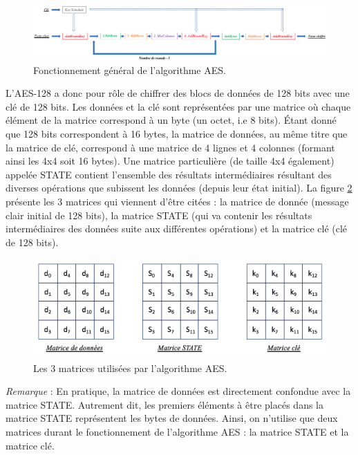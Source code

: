 \documentclass[oneside]{book}
\begin{document}
\vspace{0.5cm}

\begin{figure}[htbp]
    \hspace{-2.1cm}
    \includegraphics[scale=0.48]{image/AES_General}
    \caption{Fonctionnement général de l'algorithme AES.}
    \label{fig:AES_General}
\end{figure}

\newpage

L'AES-128 a donc pour rôle de chiffrer des blocs de données de 128 bits avec une clé de 128 bits. Les données et la clé sont représentées par une matrice où chaque élément de la matrice correspond à un byte (un octet, i.e 8 bits). Étant donné que 128 bits correspondent à 16 bytes, la matrice de données, au même titre que la matrice de clé, correspond à une matrice de 4 lignes et 4 colonnes (formant ainsi les 4x4 soit 16 bytes). Une matrice particulière (de taille 4x4 également) appelée STATE contient l'ensemble des résultats intermédiaires résultant des diverses opérations que subissent les données (depuis leur état initial). La figure \ref{fig:matrix} présente les 3 matrices qui viennent d'être citées : la matrice de donnée (message clair initial de 128 bits), la matrice STATE (qui va contenir les résultats intermédiaires des données suite aux différentes opérations) et la matrice clé (clé de 128 bits).
\begin{figure}[htbp]
    \centering
    \includegraphics[scale=0.6]{image/matrix}
    \caption{Les 3 matrices utilisées par l'algorithme AES.}
    \label{fig:matrix}
\end{figure}

\hspace{-0.5cm}\textit{Remarque} : En pratique, la matrice de données est directement confondue avec la matrice STATE. Autrement dit, les premiers éléments à être placés dans la matrice STATE représentent les bytes de données. Ainsi, on n'utilise que deux matrices durant le fonctionnement de l'algorithme AES : la matrice STATE et la matrice clé.
\end{document}
